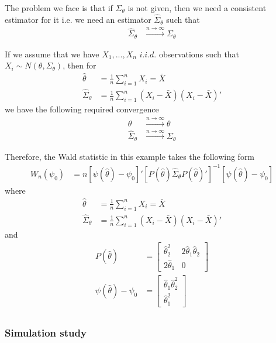 \documentclass[]{article}\usepackage[]{graphicx}\usepackage[]{color}
\begin{document}
The problem we face is that if $\Sigma_\theta$ is not given, then we need a consistent estimator for it i.e. we need an estimator $\hat{\Sigma}_\theta$ such that
\begin{align}
	\hat{\Sigma}_\theta & \xrightarrow{n \rightarrow \infty} \Sigma_\theta
\end{align}

If we assume that we have $X_1,...,X_n$ $i.i.d.$ observations such that $X_i \sim N(\theta,\Sigma_\theta)$, then for
\begin{align}
	\hat{\theta} &  = \frac{1}{n} \sum_{i=1}^{n} X_i = \bar{X} \\
	\hat{\Sigma}_\theta  & = \frac{1}{n} \sum_{i=1}^{n} (X_i-\bar{X}) (X_i-\bar{X})'
\end{align}
we have the following required convergence
\begin{align}
	\hat{\theta} & \xrightarrow{n \rightarrow \infty} \theta \\
	\hat{\Sigma}_\theta & \xrightarrow{n \rightarrow \infty}  \Sigma_\theta
\end{align}

Therefore, the Wald statistic in this example takes the following form
\begin{align}
	W_n(\psi_0) & = n \left[\psi (\hat{\theta}) - \psi_0\right]' \left[P (\hat{\theta})\hat{\Sigma}_\theta P (\hat{\theta})'\right]^{-1} \left[\psi (\hat{\theta}) - \psi_0\right]
\end{align}
where
\begin{align}
	\hat{\theta} &  = \frac{1}{n} \sum_{i=1}^{n} X_i = \bar{X} \\
	\hat{\Sigma}_\theta  & = \frac{1}{n} \sum_{i=1}^{n} (X_i-\bar{X}) (X_i-\bar{X})'
\end{align}
and
\begin{align}
	P(\hat{\theta}) & = \left[ \begin{array}{cc}
		\hat{\theta}_2^2 & 2\hat{\theta}_1 \hat{\theta}_2 \\
		2\hat{\theta}_1 & 0
	\end{array} \right] \\
	\psi (\hat{\theta}) - \psi_0 & = \left[ \begin{array}{c}
		\hat{\theta}_1 \hat{\theta}_2^2 \\
		\hat{\theta}_1^2
	\end{array} \right] \\
\end{align}

\subsubsection{Simulation study}
\end{document}

